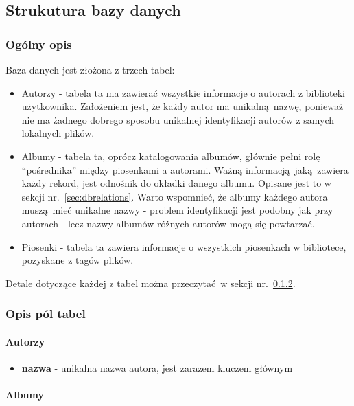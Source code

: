 \subsection{Strukutura bazy danych}

\subsubsection{Ogólny opis}

Baza danych jest złożona z trzech tabel:

\begin{itemize}
	\item Autorzy - tabela ta ma zawierać wszystkie informacje o autorach z biblioteki użytkownika. Założeniem jest, że każdy autor ma unikalną nazwę, ponieważ nie ma żadnego dobrego sposobu unikalnej identyfikacji autorów z samych lokalnych plików.

	\item Albumy - tabela ta, oprócz katalogowania albumów, głównie pełni rolę \enquote{pośrednika} między piosenkami a autorami. Ważną informacją jaką zawiera każdy rekord, jest odnośnik do okładki danego albumu. Opisane jest to w sekcji nr.~\ref{sec:dbrelations}. Warto wspomnieć, że albumy każdego autora muszą mieć unikalne nazwy - problem identyfikacji jest podobny jak przy autorach - lecz nazwy albumów różnych autorów mogą się powtarzać. 
	
	\item Piosenki - tabela ta zawiera informacje o wszystkich piosenkach w bibliotece, pozyskane z tagów plików.
\end{itemize}

Detale dotyczące każdej z tabel można przeczytać w sekcji nr.~\ref{sec:dbtables}.

\subsubsection{Opis pól tabel} \label{sec:dbtables}

\paragraph{Autorzy}

\begin{itemize}
	\item \textbf{nazwa} - unikalna nazwa autora, jest zarazem kluczem głównym
\end{itemize}

\paragraph{Albumy}

